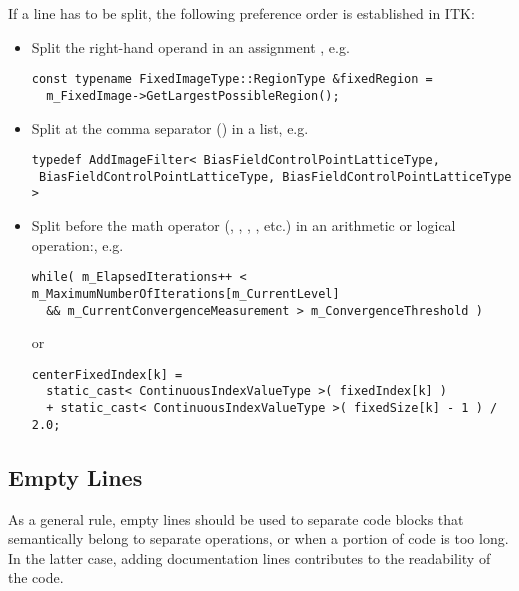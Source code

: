 If a line has to be split, the following preference order is established in ITK:
\begin{itemize}
\item Split the right-hand operand in an assignment \code{=}, e.g.

\small
\begin{verbatim}
const typename FixedImageType::RegionType &fixedRegion =
  m_FixedImage->GetLargestPossibleRegion();
\end{verbatim}
\normalsize

\item Split at the comma separator (\code{,}) in a list, e.g.

\small
\begin{verbatim}
typedef AddImageFilter< BiasFieldControlPointLatticeType,
 BiasFieldControlPointLatticeType, BiasFieldControlPointLatticeType >
\end{verbatim}
\normalsize

\item Split before the math operator (\code{+}, \code{*}, \code{||}, \code{\&\&},
etc.) in an arithmetic or logical operation:, e.g.

\small
\begin{verbatim}
while( m_ElapsedIterations++ < m_MaximumNumberOfIterations[m_CurrentLevel]
  && m_CurrentConvergenceMeasurement > m_ConvergenceThreshold )
\end{verbatim}
\normalsize

or

\small
\begin{verbatim}
centerFixedIndex[k] =
  static_cast< ContinuousIndexValueType >( fixedIndex[k] )
  + static_cast< ContinuousIndexValueType >( fixedSize[k] - 1 ) / 2.0;
\end{verbatim}
\normalsize

\end{itemize}


\subsection{Empty Lines}
\label{subsec:EmptyLines}

As a general rule, empty lines should be used to separate code blocks that
semantically belong to separate operations, or when a portion of code is
too long. In the latter case, adding documentation lines contributes to the
readability of the code.

